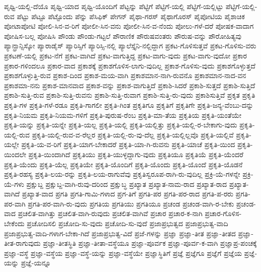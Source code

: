 {ಪೃಥ್ವಿ-ಯಲ್ಲಿ-ದೆಯೊ
ಪೃಥ್ವಿ-ಯಾದ
ಪೃಥ್ವಿ-ಯೊಂದಿಗೆ
ಪೆಟ್ಟನ್ನು
ಪೆಟ್ಟಿಗೆ
ಪೆಟ್ಟಿಗೆ-ಯಲ್ಲಿ
ಪೆಟ್ಟಿಗೆ-ಯಲ್ಲಿಟ್ಟು
ಪೆಟ್ಟಿಗೆ-ಯಲ್ಲಿ-ರುವ
ಪೆಟ್ಟು
ಪೆಟ್ಟೂ
ಪೆಟ್ಟೊಂದು
ಪೆನ್ನು
ಪೆಸಿಫಿಕ್
ಪೇಗನ್
ಪೈಥಾ-ಗರಸ್
ಪೈಥಾಗೊರಸ್
ಪೈಪೋಟಿಯ
ಪೈಶಾಚಿಕ
ಪೋಟಾಪೋಟಿ
ಪೋಲಿ-ಸಿನ-ವ-ರಿಗೆ
ಪೋಲೀ-ಸಿನ-ವನು
ಪೋಲೀ-ಸಿನ-ವ-ನೆಂದು
ಪೋಲು-ಗಳೆ-ದರೆ
ಪೋಷಕ-ವಾದಾಗ
ಪೋಷಿಸ-ಬಲ್ಲ
ಪೋಷಿಸಿ
ಪೌಂಡು
ಪೌಂಡು-ಗಟ್ಟಲೆ
ಪೌರಾಣಿಕ
ಪೌರುಷವಂತರು
ಪೌರುಷ-ವನ್ನು
ಪೌರೋಹಿತ್ಯವು
ಪ್ಯಾನ್ಫ್ರಾನ್ಸಿಸ್ಕೋ
ಪ್ಯಾರಾಡೈಸ್
ಪ್ಯಾರಿಸ್ಸಿಗೆ
ಪ್ಯಾರಿಸ್ಸಿ-ನಲ್ಲಿ
ಪ್ಯಾಲೆಸ್ತೈನಿ-ನಲ್ಲಿದ್ದಾಗ
ಪ್ರಕಟ-ಗೊಳಿಸುತ್ತವೆ
ಪ್ರಕಟ-ಗೊಳಿಸು-ವರು
ಪ್ರಕಟಣೆ-ಯಲ್ಲಿ
ಪ್ರಕಟ-ನೆಗೆ
ಪ್ರಕಟ-ವಾಗಿದೆ
ಪ್ರಕಟ-ವಾಗುತ್ತಿದ್ದ
ಪ್ರಕಟ-ವಾಗು-ವುದು
ಪ್ರಕಟ-ವಾಗು-ವುದೋ
ಪ್ರಕಾರ
ಪ್ರಕಾರ-ಗಳಿಂದಲೂ
ಪ್ರಕಾರ-ವಾದ
ಪ್ರಕಾಶಕ್ಕೆ
ಪ್ರಕಾಶಗೊಳಿಸ-ಲಾಗು-ವುದಿಲ್ಲ
ಪ್ರಕಾಶ-ಗೊಳಿಸು-ವುದು
ಪ್ರಕಾಶಗೊಳ್ಳುತ್ತದೆ
ಪ್ರಕಾಶಗೊಳ್ಳುತ್ತಿ-ರುವ
ಪ್ರಕಾಶ-ದಿಂದ
ಪ್ರಕಾಶ-ಮಯ-ವಾಗಿ
ಪ್ರಕಾಶಮಾನ-ನಾಗಿ-ರುವನೊ
ಪ್ರಕಾಶಮಾನ-ನಾದ-ವನ
ಪ್ರಕಾಶಮಾ-ನನು
ಪ್ರಕಾಶ-ಮಾನವಾದ
ಪ್ರಕಾಶ-ವನ್ನು
ಪ್ರಕಾಶ-ವಾಗುತ್ತಿದೆ
ಪ್ರಕಾಶಿ-ಸಿದರೆ
ಪ್ರಕಾಶಿ-ಸುತ್ತದೆ
ಪ್ರಕಾಶಿ-ಸುತ್ತಿದೆ
ಪ್ರಕಾಶಿ-ಸುತ್ತಿ-ರುವ
ಪ್ರಕಾಶಿ-ಸುತ್ತಿ-ರುವನು
ಪ್ರಕಾಶಿ-ಸುತ್ತಿ-ರುವಾಗ
ಪ್ರಕಾಶಿ-ಸುತ್ತಿ-ರು-ವುದು
ಪ್ರಕಾಶಿಸುತ್ತಿವೆ
ಪ್ರಕೃತ
ಪ್ರಕೃತಿ
ಪ್ರಕೃತಿ-ಗಳ
ಪ್ರಕೃತಿ-ಗಳೆ-ರಡೂ
ಪ್ರಕೃತಿ-ಗಾಗಲೀ
ಪ್ರಕೃತಿ-ಗಿಂತ
ಪ್ರಕೃತಿಗೂ
ಪ್ರಕೃತಿಗೆ
ಪ್ರಕೃತಿಗೇ
ಪ್ರಕೃತಿ-ಜನ್ಯ-ವೆಂಬು-ದನ್ನು
ಪ್ರಕೃತಿ-ನಿಯಮ
ಪ್ರಕೃತಿ-ನಿಯಮ-ಗಳಿಗೆ
ಪ್ರಕೃತಿ-ಪುರುಷ-ರೆಂಬ
ಪ್ರಕೃತಿ-ಮಾ-ತೆಯ
ಪ್ರಕೃತಿಯ
ಪ್ರಕೃತಿ-ಯಂತೆಯೇ
ಪ್ರಕೃತಿ-ಯನ್ನು
ಪ್ರಕೃತಿ-ಯನ್ನೇ
ಪ್ರಕೃತಿ-ಯಲ್ಲ
ಪ್ರಕೃತಿ-ಯಲ್ಲಿ
ಪ್ರಕೃತಿ-ಯಲ್ಲಿತ್ತು
ಪ್ರಕೃತಿ-ಯಲ್ಲಿ-ರ-ಬೇಕಾಗು-ವುದು
ಪ್ರಕೃತಿ-ಯಲ್ಲಿ-ರುವ
ಪ್ರಕೃತಿ-ಯಲ್ಲಿ-ರುವ-ವ-ರೆಲ್ಲರ
ಪ್ರಕೃತಿ-ಯಲ್ಲಿ-ರು-ವು-ದೆಲ್ಲ
ಪ್ರಕೃತಿ-ಯಲ್ಲಿಲ್ಲವೊ
ಪ್ರಕೃತಿ-ಯಲ್ಲಿವೆ
ಪ್ರಕೃತಿ-ಯಲ್ಲೇ
ಪ್ರಕೃತಿ-ಯ-ವ-ರಿಗೆ
ಪ್ರಕೃತಿ-ಯಾಗ-ಬೇಕಾದರೆ
ಪ್ರಕೃತಿ-ಯಾ-ಗಿ-ರುವನು
ಪ್ರಕೃತಿ-ಯಾಚೆ
ಪ್ರಕೃತಿ-ಯಿಂದ
ಪ್ರಕೃತಿ-ಯಿಂದಲೇ
ಪ್ರಕೃತಿ-ಯಿಂದಾಗಿದೆ
ಪ್ರಕೃತಿಯು
ಪ್ರಕೃತಿ-ಯುಳ್ಳದ್ದಾಗು-ವುದು
ಪ್ರಕೃತಿಯೂ
ಪ್ರಕೃತಿಯೆ
ಪ್ರಕೃತಿ-ಯೆಂದರೆ
ಪ್ರಕೃತಿ-ಯೆಂದು
ಪ್ರಕೃತಿ-ಯೆಲ್ಲ
ಪ್ರಕೃತಿಯೇ
ಪ್ರಕೃತಿ-ಯೊಂದಿಗೆ
ಪ್ರಕೃತಿ-ಯೊಂದು
ಪ್ರಕೃತಿ-ಯೊಂದೆ
ಪ್ರಕೃತಿ-ಯೊಡನೆ
ಪ್ರಕೃತಿ-ರಹಸ್ಯ
ಪ್ರಕೃತಿ-ಲಯ-ರನ್ನು
ಪ್ರಕೃತಿ-ಲಯ-ರಾಗುವೆವು
ಪ್ರಕೃತಿಸ್ವರೂಪ-ರಾಗಿ-ರು-ವುದಿಲ್ಲ
ಪ್ರಕ್ರಿ-ಯೆ-ಗಳನ್ನೇ
ಪ್ರಕ್ರಿ-ಯೆ-ಗಳು
ಪ್ರಕ್ಷುಬ್ದ
ಪ್ರಕ್ಷುಬ್ದ-ವಾಗಿ-ರುವು-ದರಿಂದ
ಪ್ರಕ್ಷುಬ್ಧ
ಪ್ರಖ್ಯಾತ
ಪ್ರಖ್ಯಾತ-ನಾಮ-ರಾದ
ಪ್ರಖ್ಯಾತ-ರಾದ
ಪ್ರಖ್ಯಾತ-ವಾಗಿದೆ
ಪ್ರಖ್ಯಾತ-ವಾದ
ಪ್ರಗತಿ
ಪ್ರಗತಿ-ಗಾಮಿ-ಗಳಾದ
ಪ್ರಗ-ತಿಗೆ
ಪ್ರಗತಿ-ಪರ
ಪ್ರಗತಿ-ಪರ-ರಾದ
ಪ್ರಗತಿ-ಪ-ರರು
ಪ್ರಗತಿ-ಪರ-ವಾಗಿ
ಪ್ರಗತಿ-ಪರ-ವಾಗಿ-ರು-ವುದು
ಪ್ರಗತಿಯ
ಪ್ರಗತಿಯು
ಪ್ರಗತಿಯೂ
ಪ್ರಚಂಡ
ಪ್ರಚಂಡ-ವಾಗಿ-ರ-ಬೇಕು
ಪ್ರಚಂಡ-ವಾದ
ಪ್ರಚಲಿತ-ವಾಗಿತ್ತು
ಪ್ರಚಲಿತ-ವಾಗಿ-ರುವುದು
ಪ್ರಚಲಿತ-ವಾಗಿವೆ
ಪ್ರಚಾರ
ಪ್ರಚಾರ-ಕ-ನಾಗಿ
ಪ್ರಚಾರ-ಗೊಳಿಸ-ಬೇಕೆಂದು
ಪ್ರಚೋದಿಸಲಿ
ಪ್ರಚೋದಿ-ಸು-ವುದು
ಪ್ರಚೋದಿ-ಸು-ವುದೆ
ಪ್ರಜಾಪ್ರಭುತ್ವದ
ಪ್ರಜಾಪ್ರಭುತ್ವ-ವಾದಿ
ಪ್ರಜಾಪ್ರಭುತ್ವ-ವಾದಿ-ಗಳಾಗ-ಬೇಕಾ-ಗಿದೆ
ಪ್ರಜಾಪ್ರಭುತ್ವ-ವಿದೆ
ಪ್ರಜೆ-ಗಳನ್ನು
ಪ್ರಜ್ಞಾ
ಪ್ರಜ್ಞಾ-ತೀತ
ಪ್ರಜ್ಞಾ-ತೀತದ
ಪ್ರಜ್ಞಾ-ತೀತ-ರಾಗುವುದು
ಪ್ರಜ್ಞಾ-ತೀತಸ್ಥಿತಿ
ಪ್ರಜ್ಞಾ-ತೀತಾ-ವಸ್ಥೆಯೂ
ಪ್ರಜ್ಞಾ-ಪೂರ್ವಕ
ಪ್ರಜ್ಞಾ-ಪೂರ್ವ-ಕ-ವಾಗಿ
ಪ್ರಜ್ಞಾಪ್ರ-ಪಂಚಕ್ಕೆ
ಪ್ರಜ್ಞಾ-ವಸ್ಥೆ
ಪ್ರಜ್ಞಾ-ವಸ್ಥೆಯ
ಪ್ರಜ್ಞಾ-ವಸ್ಥೆ-ಯನ್ನು
ಪ್ರಜ್ಞಾ-ವಸ್ಥೆಯೇ
ಪ್ರಜ್ಞಾಸ್ಥಿತಿಗೆ
ಪ್ರಜ್ಞೆ
ಪ್ರಜ್ಞೆಗೂ
ಪ್ರಜ್ಞೆಗೆ
ಪ್ರಜ್ಞೆಯ
ಪ್ರಜ್ಞೆ-ಯನ್ನು
ಪ್ರಜ್ಞೆ-ಯನ್ನೂ
}
